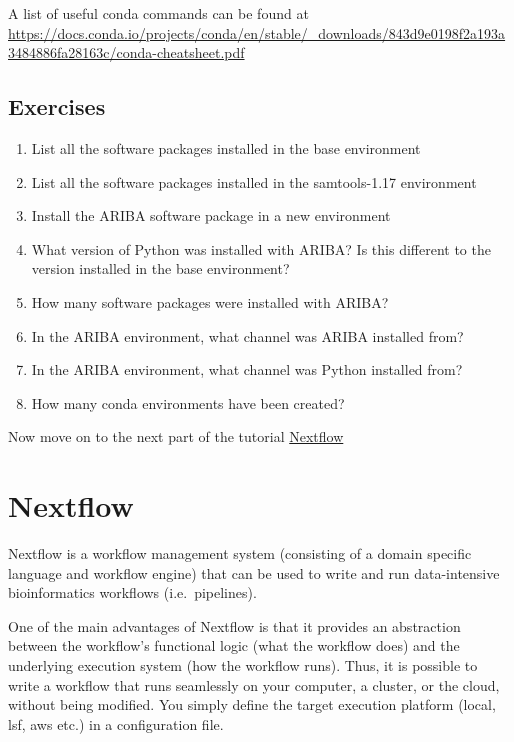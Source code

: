 \documentclass[11pt]{article}
\providecommand{\tightlist}{%
      \setlength{\itemsep}{0pt}\setlength{\parskip}{0pt}}
\begin{document}
A list of useful conda commands can be found at
\url{https://docs.conda.io/projects/conda/en/stable/_downloads/843d9e0198f2a193a3484886fa28163c/conda-cheatsheet.pdf}

    \hypertarget{exercises}{%
\subsection{Exercises}\label{exercises}}

\begin{enumerate}
\def\labelenumi{\arabic{enumi}.}
\tightlist
\item
  List all the software packages installed in the base environment
\item
  List all the software packages installed in the samtools-1.17
  environment
\item
  Install the ARIBA software package in a new environment
\item
  What version of Python was installed with ARIBA? Is this different to
  the version installed in the base environment?
\item
  How many software packages were installed with ARIBA?
\item
  In the ARIBA environment, what channel was ARIBA installed from?
\item
  In the ARIBA environment, what channel was Python installed from?
\item
  How many conda environments have been created?
\end{enumerate}

    Now move on to the next part of the tutorial
\href{nextflow.ipynb}{Nextflow}





\newpage





    \hypertarget{nextflow}{%
\section{Nextflow}\label{nextflow}}

Nextflow is a workflow management system (consisting of a domain
specific language and workflow engine) that can be used to write and run
data-intensive bioinformatics workflows (i.e.~pipelines).

One of the main advantages of Nextflow is that it provides an
abstraction between the workflow's functional logic (what the workflow
does) and the underlying execution system (how the workflow runs). Thus,
it is possible to write a workflow that runs seamlessly on your
computer, a cluster, or the cloud, without being modified. You simply
define the target execution platform (local, lsf, aws etc.) in a
configuration file.
\end{document}
